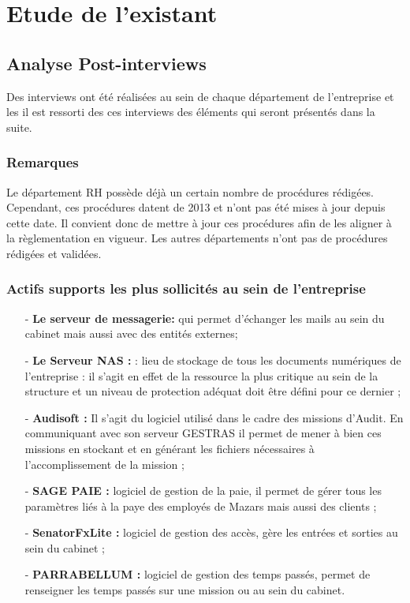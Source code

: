 \section{Etude de l'existant}
\subsection{Analyse Post-interviews}
Des interviews ont été réalisées au sein de chaque département de l'entreprise et les il est ressorti des ces interviews des éléments qui seront présentés dans la suite.
\subsubsection{Remarques}
Le département RH possède déjà un certain nombre de procédures rédigées. Cependant, ces procédures datent de 2013 et n’ont pas été mises à jour depuis cette date. Il convient donc de mettre à jour ces procédures afin de les aligner à la règlementation en vigueur. Les autres départements n’ont pas de procédures rédigées et validées.
\subsubsection{Actifs supports les plus sollicités au sein de l’entreprise}
\begin{itemize}
    \item[-] \textbf{Le serveur de messagerie:} qui permet d’échanger les mails au sein du cabinet mais aussi avec des entités externes;
    \item[-] \textbf{Le Serveur NAS :} : lieu de stockage de tous les documents numériques de l’entreprise : il s’agit en effet de la ressource la plus critique au sein de la structure et un niveau de protection adéquat doit être défini pour ce dernier ;
    \item[-] \textbf{Audisoft :} Il s’agit du logiciel utilisé dans le cadre des missions d’Audit. En communiquant avec son serveur GESTRAS il permet de mener à bien ces missions en stockant et en générant les fichiers nécessaires à l’accomplissement de la mission ;
    \item[-] \textbf{SAGE PAIE : }logiciel de gestion de la paie, il permet de gérer tous les paramètres liés à la paye des employés de Mazars mais aussi des clients ;
    \item[-] \textbf{SenatorFxLite : }logiciel de gestion des accès, gère les entrées et sorties au sein du cabinet ;
    \item[-] \textbf{PARRABELLUM : }logiciel de gestion des temps passés, permet de renseigner les temps passés sur une mission ou au sein du cabinet.
\end{itemize}

